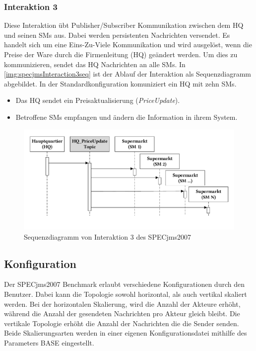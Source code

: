 \subsubsection{Interaktion 3}
\label{sec:interaction3desc}
Diese Interaktion übt Publisher/Subscriber Kommunikation zwischen dem HQ und seinen SMs aus. Dabei werden persistenten Nachrichten versendet. Es handelt sich um eine Eins-Zu-Viele Kommunikation und wird ausgelöst, wenn die Preise der Ware durch die Firmenleitung (HQ) geändert werden. Um dies zu kommunizieren, sendet das HQ Nachrichten an alle SMs. In \autoref{img:specjmsInteraction3seq} ist der Ablauf der Interaktion als Sequenzdiagramm abgebildet. In der Standardkonfiguration komuniziert ein HQ mit zehn SMs.
\begin{itemize}
    \item Das HQ sendet ein Preisaktualisierung (\emph{PriceUpdate}).
    \item Betroffene SMs empfangen und ändern die Information in ihrem System.
\end{itemize}


\begin{figure}
\center
  \includegraphics[width=1\textwidth]{images/evaluation/specjms/evaluationInteraktion3seq.pdf}
  \caption{Sequenzdiagramm von Interaktion 3 des SPECjms2007}
  \label{img:specjmsInteraction3seq}
\end{figure}


\subsection{Konfiguration}
Der SPECjms2007 Benchmark erlaubt verschiedene Konfigurationen durch den Benutzer. Dabei kann die Topologie sowohl horizontal, als auch vertikal skaliert werden. Bei der horizontalen Skalierung, wird die Anzahl der Akteure erhöht, während die Anzahl der gesendeten Nachrichten pro Akteur gleich bleibt. Die vertikale Topologie erhöht die Anzahl der Nachrichten die die Sender senden. Beide Skalierungsarten werden in einer eigenen Konfigurationsdatei mithilfe des Parameters BASE eingestellt.

